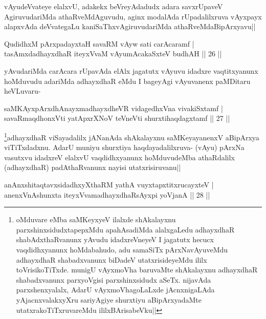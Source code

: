 \begin{artha}
vAyudeVvateye elalxvU, adakekx beVreyAdadudx adara savxrUpaveV AgiruvudariMda athaRveMdAguvudu, aginx modalAda rUpadalilxruva vAyxpayx alapxvAda deVvategaLu kaniSaThxvAgiruvudariMda athaRveMdaBipArxyavu||
\end{artha}


\begin{shl}
QudidhxM pArxpadayxtaH savaRM vAyw sati carAcaramf |\\
tasAmxdadhayxdhaR iteyxVvaM vAyumAcakaSxteV budhAH \hfill || 26 ||
\end{shl}

\begin{artha}
yAvudariMda carAcara rUpavAda elAlx jagatutx vAyuvu idadxre vaqtitxyanunx hoMduvudu adariMda adhayxdhaR eMdu I bageyAgi vAyuvanenx paMDitaru heVLuvaru-
\end{artha}

\begin{shl}
saMKAyxpArxdhAnayxmadhayxdheVR vidagedhxVna vivakiSxtamf |\\
savaRmaqdhonxVti yatApxrXNoV teVneVti shurxtihaqdagxtamf \hfill || 27 ||
\end{shl}

\begin{artha}
\footnote[1]{oMduvare eMba saMKeyxyeV ilalxde shAkalayxnu parxshinxsidudxtapepxMdu apahAsadiMda alalxgaLedu adhayxdhaR shabAdxthaRvanunx yAvudu idadxreVneyeV I jagatutx hecucx vaqdidhxyanunx hoMdabahudo, adu samaSiTx pArxNavAyuveMdu adhayxdhaR shabadxvanunx biDadeV utatxrisideyeMdu ililx toVrisikoTiTxde. munigU vAyxmoVha baruvaMte shAkalayxnu adhayxdhaR shabadxvanunx parxyoVgisi  parxshinxsidudx aSeTx. nijavAda parxshenxyalalx, AdarU vAyxmoVhagoLaLxde jAcnxnigaLAda yAjacnxvalakxyXru sariyAgiye shurxtiyu aBipArxyadaMte utatxrakoTiTxruvareMdu ililxBArisabeVku||}adhayxdhaR viSayadalilx jANanAda shAkalayxnu saMKeyayanenxV aBipArxya viTiTxdadxnu. AdarU muniyu shurxtiya haqdayadalilxruva- (vAyu) pArxNa vasutxvu idadxreV elalxvU vaqdidhxyanunx hoMduvudeMba athaRdalilx (adhayxdhaR) padAthaRvanunx nayisi utatxrisiruvanu||
\end{artha}


\begin{shl}
anAnxshitaqtavxsidadhxyXthaRM yathA vuyxtapxtitxrucayxteV |\\
anenxVnAshunxta iteyxVvamadhayxdhaRsAyxpi yoVjanA \hfill || 28 ||
\end{shl}

